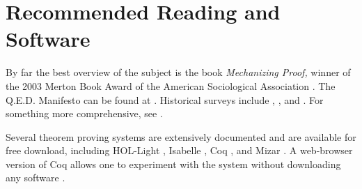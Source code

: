 \documentclass{llncs}
\begin{document}
\section{Recommended Reading and Software}

By far the best overview of the subject is the book {\it Mechanizing Proof,}  winner of the 2003 Merton Book Award of
the American Sociological Association \cite{Mac}.
The Q.E.D. Manifesto can be found at \cite{QED}.
Historical surveys include \cite{Bled},
\cite{Ha07}, and
\cite{Mu}.
For something more comprehensive, see \cite{Ha08}.


Several theorem proving systems are extensively documented and are available for free download,
including HOL-Light \cite{HOLL}, Isabelle \cite{Isa}, Coq \cite{COQ},
and Mizar \cite{Mizar}.  A web-browser version
of Coq allows one to experiment with the system without
downloading any software \cite{PW}.


\end{document}
